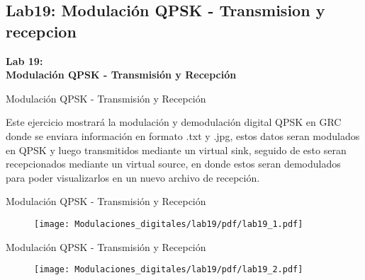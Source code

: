 \subsection{Lab19: Modulación QPSK - Transmision y recepcion}

\begin{frame}{}


\bfseries{\textrm{ \Large Lab 19: \\Modulación QPSK - Transmisión y Recepción}}
\raggedright
\end{frame}

\begin{frame}{Modulación QPSK - Transmisión y Recepción}


\justifying
Este ejercicio mostrará la modulación y demodulación digital QPSK en GRC donde se enviara información en formato .txt y .jpg, estos datos seran modulados en QPSK y luego transmitidos mediante un virtual sink, seguido de esto seran recepcionados mediante un virtual source, en donde estos seran demodulados para poder visualizarlos en un nuevo archivo de recepción. 

\end{frame}
\begin{frame}{Modulación QPSK - Transmisión y Recepción}
\begin{figure}
\texttt{[image: Modulaciones\_digitales/lab19/pdf/lab19\_1.pdf]}
\end{figure}
\end{frame}
\begin{frame}{Modulación QPSK - Transmisión y Recepción}
\begin{figure}
\texttt{[image: Modulaciones\_digitales/lab19/pdf/lab19\_2.pdf]}
\end{figure}
\end{frame}


